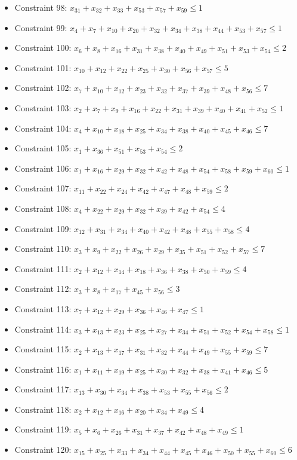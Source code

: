 \documentclass[11pt]{article}
\begin{document}
\begin{itemize}
\item Constraint 98: $x_{31} + x_{32} + x_{33} + x_{53} + x_{57} + x_{59} \le 1$
\item Constraint 99: $x_{4} + x_{7} + x_{10} + x_{20} + x_{32} + x_{34} + x_{38} + x_{44} + x_{53} + x_{57} \le 1$
\item Constraint 100: $x_{6} + x_{8} + x_{16} + x_{31} + x_{38} + x_{40} + x_{49} + x_{51} + x_{53} + x_{54} \le 2$
\item Constraint 101: $x_{10} + x_{12} + x_{22} + x_{25} + x_{30} + x_{56} + x_{57} \le 5$
\item Constraint 102: $x_{7} + x_{10} + x_{12} + x_{23} + x_{32} + x_{37} + x_{39} + x_{48} + x_{56} \le 7$
\item Constraint 103: $x_{2} + x_{7} + x_{9} + x_{16} + x_{22} + x_{31} + x_{39} + x_{40} + x_{41} + x_{52} \le 1$
\item Constraint 104: $x_{4} + x_{10} + x_{18} + x_{25} + x_{34} + x_{38} + x_{40} + x_{45} + x_{46} \le 7$
\item Constraint 105: $x_{1} + x_{36} + x_{51} + x_{53} + x_{54} \le 2$
\item Constraint 106: $x_{1} + x_{16} + x_{29} + x_{32} + x_{42} + x_{48} + x_{54} + x_{58} + x_{59} + x_{60} \le 1$
\item Constraint 107: $x_{11} + x_{22} + x_{24} + x_{42} + x_{47} + x_{48} + x_{59} \le 2$
\item Constraint 108: $x_{4} + x_{22} + x_{29} + x_{32} + x_{39} + x_{42} + x_{54} \le 4$
\item Constraint 109: $x_{12} + x_{31} + x_{34} + x_{40} + x_{42} + x_{48} + x_{55} + x_{58} \le 4$
\item Constraint 110: $x_{3} + x_{9} + x_{22} + x_{26} + x_{29} + x_{35} + x_{51} + x_{52} + x_{57} \le 7$
\item Constraint 111: $x_{2} + x_{12} + x_{14} + x_{18} + x_{36} + x_{38} + x_{50} + x_{59} \le 4$
\item Constraint 112: $x_{3} + x_{8} + x_{17} + x_{45} + x_{56} \le 3$
\item Constraint 113: $x_{7} + x_{12} + x_{29} + x_{36} + x_{46} + x_{47} \le 1$
\item Constraint 114: $x_{3} + x_{13} + x_{23} + x_{25} + x_{27} + x_{34} + x_{51} + x_{52} + x_{54} + x_{58} \le 1$
\item Constraint 115: $x_{2} + x_{13} + x_{17} + x_{31} + x_{32} + x_{44} + x_{49} + x_{55} + x_{59} \le 7$
\item Constraint 116: $x_{1} + x_{11} + x_{19} + x_{25} + x_{30} + x_{32} + x_{38} + x_{41} + x_{46} \le 5$
\item Constraint 117: $x_{13} + x_{30} + x_{34} + x_{38} + x_{53} + x_{55} + x_{56} \le 2$
\item Constraint 118: $x_{2} + x_{12} + x_{16} + x_{20} + x_{34} + x_{49} \le 4$
\item Constraint 119: $x_{5} + x_{6} + x_{26} + x_{31} + x_{37} + x_{42} + x_{48} + x_{49} \le 1$
\item Constraint 120: $x_{15} + x_{25} + x_{33} + x_{34} + x_{44} + x_{45} + x_{46} + x_{50} + x_{55} + x_{60} \le 6$
\end{itemize}
\end{document}
